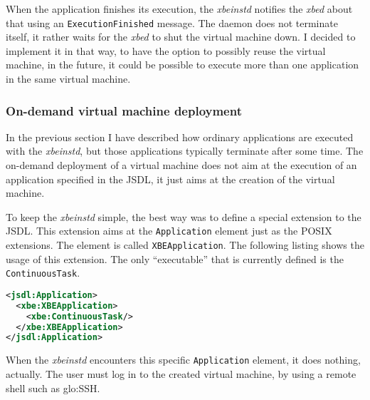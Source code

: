 When the application finishes  its execution, the \emph{xbeinstd} notifies
the   \emph{xbed}   about   that   using   an   \texttt{ExecutionFinished}
message. The  daemon does  not terminate itself,  it rather waits  for the
\emph{xbed} to shut the virtual machine down. I decided to implement it in
that way, to have the option to possibly reuse the virtual machine, \ie in
the future, it  could be possible to execute more  than one application in
the same virtual machine.

\subsubsection{On-demand virtual machine deployment}

In the  previous section  I have described  how ordinary  applications are
executed  with  the  \emph{xbeinstd},  but  those  applications  typically
terminate after some  time. The on-demand deployment of  a virtual machine
does not aim at the execution  of an application specified in the JSDL, it
just aims at the creation of the virtual machine.

To keep the  \emph{xbeinstd} simple, the best way was  to define a special
extension to  the JSDL.  This  extension aims at  the \texttt{Application}
element   just  as   the  POSIX   extensions.   The   element   is  called
\texttt{XBEApplication}.  The  following listing  shows the usage  of this
extension.  The  only ``executable''  that  is  currently  defined is  the
\texttt{ContinuousTask}.

\bigskip

\begin{center}
  \begin{minipage}{.75\textwidth}
    \begin{lstlisting}[captionpos=b,backgroundcolor=\color{listingcolor},frame=lines,numbers=none,stepnumber=5,numberfirstline=false,numberstyle=\tiny,caption={Example
        of a \texttt{ContinuousTask} used for on-demand virtual machine deployment.},label={lst:xbe-xbeinstd-continuous-task},language=XML]
<jsdl:Application>
  <xbe:XBEApplication>
    <xbe:ContinuousTask/>
  </xbe:XBEApplication>
</jsdl:Application>
    \end{lstlisting}
  \end{minipage}
\end{center}

When  the \emph{xbeinstd}  encounters  this specific  \texttt{Application}
element, it does  nothing, actually.  The user must log  in to the created
virtual machine, \eg by using a remote shell such as \gls{glo:SSH}.

